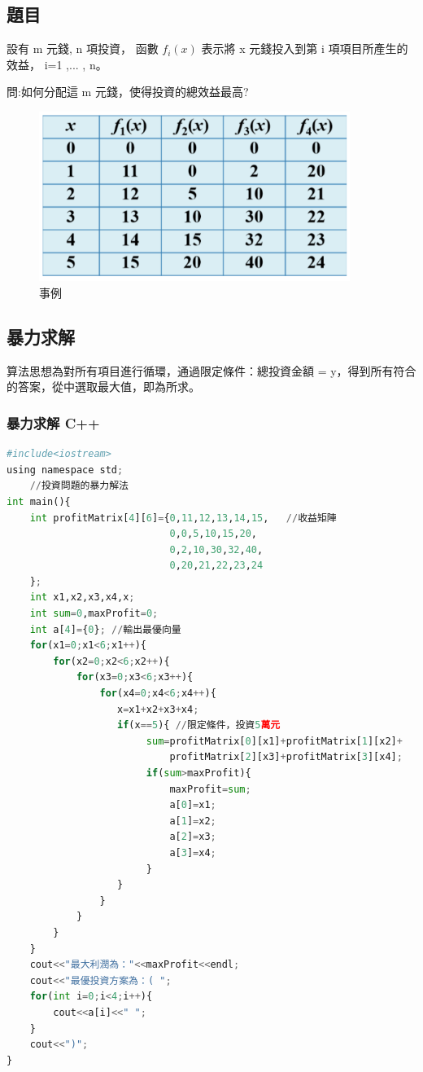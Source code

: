 \documentclass[10pt,UTF8]{ctexart}
\begin{document}
\subsection{題目}

設有 m 元錢, n 項投資， 函數 $f_{i}(x)$ 表示將 x 元錢投入到第 i 項項目所產生的效益， i=1 ,... , n。

問:如何分配這 m 元錢，使得投資的總效益最高?

\begin{figure}[H]
\centering 
\includegraphics[width=0.90\textwidth]{w6-kp-3.png} 
\caption{事例}
\label{Test}
\end{figure}

\subsection{暴力求解}

算法思想為對所有項目進行循環，通過限定條件：總投資金額 = y，得到所有符合的答案，從中選取最大值，即為所求。

\subsubsection{暴力求解 C++}

\begin{lstlisting}[language={python}]
#include<iostream>
using namespace std;
    //投資問題的暴力解法
int main(){
    int profitMatrix[4][6]={0,11,12,13,14,15,   //收益矩陣
                            0,0,5,10,15,20,
                            0,2,10,30,32,40,
                            0,20,21,22,23,24
    };
    int x1,x2,x3,x4,x;
    int sum=0,maxProfit=0;
    int a[4]={0}; //輸出最優向量
    for(x1=0;x1<6;x1++){
        for(x2=0;x2<6;x2++){
            for(x3=0;x3<6;x3++){
                for(x4=0;x4<6;x4++){
                   x=x1+x2+x3+x4;
                   if(x==5){ //限定條件，投資5萬元
                        sum=profitMatrix[0][x1]+profitMatrix[1][x2]+
                            profitMatrix[2][x3]+profitMatrix[3][x4];
                        if(sum>maxProfit){
                            maxProfit=sum;
                            a[0]=x1;
                            a[1]=x2;
                            a[2]=x3;
                            a[3]=x4;
                        }
                   }
                }
            }
        }
    }
    cout<<"最大利潤為："<<maxProfit<<endl;
    cout<<"最優投資方案為：( ";
    for(int i=0;i<4;i++){
        cout<<a[i]<<" ";
    }
    cout<<")";
}
\end{lstlisting}
\end{document}
